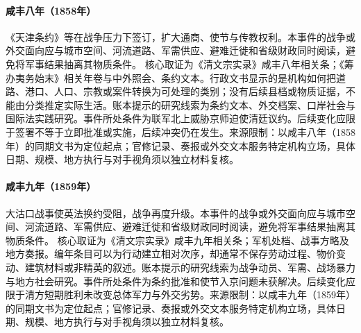 \hypertarget{civic:EQ-1858-TIANJIN-TREATIES}{}\paragraph{咸丰八年（1858年）}《天津条约》等在战争压力下签订，扩大通商、使节与传教权利。本事件的战争或外交面向应与城市空间、河流道路、军需供应、避难迁徙和省级财政同时阅读，避免将军事结果抽离其物质条件。 核心取证为《清文宗实录》咸丰八年相关条；《筹办夷务始末》相关年卷与中外照会、条约文本。行政文书显示的是机构如何把道路、港口、人口、宗教或案件转换为可处理的类别；没有后续县档或物质证据，不能由分类推定实际生活。账本提示的研究线索为条约文本、外交档案、口岸社会与国际法实践研究。事件所处条件为联军北上威胁京师迫使清廷议约。后续变化应限于签署不等于立即批准或实施，后续冲突仍在发生。来源限制：以咸丰八年（1858年）的同期文书为定位起点；官修记录、奏报或外交文本服务特定机构立场，具体日期、规模、地方执行与对手视角须以独立材料复核。
\hypertarget{civic:EQ-1859-TAKU-BATTLE}{}\paragraph{咸丰九年（1859年）}大沽口战事使英法换约受阻，战争再度升级。本事件的战争或外交面向应与城市空间、河流道路、军需供应、避难迁徙和省级财政同时阅读，避免将军事结果抽离其物质条件。 核心取证为《清文宗实录》咸丰九年相关条；军机处档、战事方略及地方奏报。编年条目可以为行动建立相对次序，却通常不保存劳动过程、物价变动、建筑材料或非精英的叙述。账本提示的研究线索为战争动员、军需、战场暴力与地方社会研究。事件所处条件为条约批准和使节入京问题未获解决。后续变化应限于清方短期胜利未改变总体军力与外交劣势。来源限制：以咸丰九年（1859年）的同期文书为定位起点；官修记录、奏报或外交文本服务特定机构立场，具体日期、规模、地方执行与对手视角须以独立材料复核。
